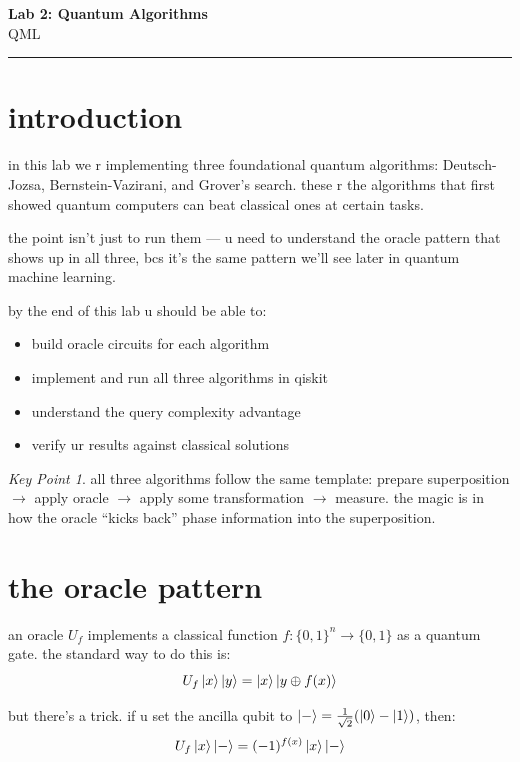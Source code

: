 \documentclass[11pt,a4paper]{article}
\theoremstyle{definition}
\theoremstyle{remark}
\newtheorem*{keypoint}{Key Point}
\begin{document}
{\LARGE \textbf{Lab 2: Quantum Algorithms}}\\[8pt]
{\large QML}\\[12pt]
\hrule

\vspace{16pt}

\section{introduction}

in this lab we r implementing three foundational quantum algorithms: Deutsch-Jozsa, Bernstein-Vazirani, and Grover's search. these r the algorithms that first showed quantum computers can beat classical ones at certain tasks.

the point isn't just to run them --- u need to understand the oracle pattern that shows up in all three, bcs it's the same pattern we'll see later in quantum machine learning.

by the end of this lab u should be able to:
\begin{itemize}[leftmargin=*]
  \item build oracle circuits for each algorithm
  \item implement and run all three algorithms in qiskit
  \item understand the query complexity advantage
  \item verify ur results against classical solutions
\end{itemize}

\begin{keypoint}
all three algorithms follow the same template: prepare superposition $\to$ apply oracle $\to$ apply some transformation $\to$ measure. the magic is in how the oracle ``kicks back'' phase information into the superposition.
\end{keypoint}

\section{the oracle pattern}

an oracle $U_f$ implements a classical function $f: \{0,1\}^n \to \{0,1\}$ as a quantum gate. the standard way to do this is:
\[
U_f\ket{x}\ket{y} = \ket{x}\ket{y \oplus f(x)}
\]

but there's a trick. if u set the ancilla qubit to $\ket{-} = \frac{1}{\sqrt{2}}(\ket{0}-\ket{1})$, then:
\[
U_f\ket{x}\ket{-} = (-1)^{f(x)}\ket{x}\ket{-}
\]
\end{document}
